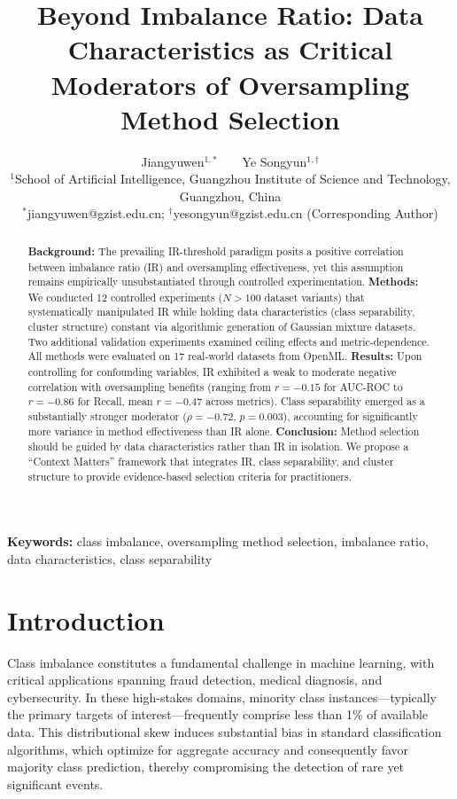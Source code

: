 \documentclass[12pt,a4paper]{article}
\title{Beyond Imbalance Ratio: Data Characteristics as Critical Moderators of Oversampling Method Selection}
\author{
 Jiangyuwen$^{1,*}$\orcidlink{0009-0001-4022-1436}~~~~Ye Songyun$^{1,\dagger}$\orcidlink{0009-0009-5048-3147}\\[0.8em]
 \normalsize $^1$School of Artificial Intelligence, Guangzhou Institute of Science and Technology,\\
 \normalsize Guangzhou, China\\[0.3em]
 \normalsize $^*$jiangyuwen@gzist.edu.cn; $^\dagger$yesongyun@gzist.edu.cn (Corresponding Author)
}
\date{}
\theoremstyle{definition}
\begin{document}
\maketitle


\begin{abstract}
\textbf{Background:} The prevailing IR-threshold paradigm posits a positive correlation between imbalance ratio (IR) and oversampling effectiveness, yet this assumption remains empirically unsubstantiated through controlled experimentation. \textbf{Methods:} We conducted 12 controlled experiments ($N>100$ dataset variants) that systematically manipulated IR while holding data characteristics (class separability, cluster structure) constant via algorithmic generation of Gaussian mixture datasets. Two additional validation experiments examined ceiling effects and metric-dependence. All methods were evaluated on 17 real-world datasets from OpenML. \textbf{Results:} Upon controlling for confounding variables, IR exhibited a weak to moderate negative correlation with oversampling benefits (ranging from $r=-0.15$ for AUC-ROC to $r=-0.86$ for Recall, mean $r=-0.47$ across metrics). Class separability emerged as a substantially stronger moderator ($\rho=-0.72$, $p=0.003$), accounting for significantly more variance in method effectiveness than IR alone. \textbf{Conclusion:} Method selection should be guided by data characteristics rather than IR in isolation. We propose a ``Context Matters'' framework that integrates IR, class separability, and cluster structure to provide evidence-based selection criteria for practitioners.
\end{abstract}


\noindent\textbf{Keywords:} class imbalance, oversampling method selection, imbalance ratio, data characteristics, class separability

\section{Introduction}
\indent Class imbalance constitutes a fundamental challenge in machine learning, with critical applications spanning fraud detection, medical diagnosis, and cybersecurity. In these high-stakes domains, minority class instances---typically the primary targets of interest---frequently comprise less than 1\% of available data. This distributional skew induces substantial bias in standard classification algorithms, which optimize for aggregate accuracy and consequently favor majority class prediction, thereby compromising the detection of rare yet significant events.
\end{document}
